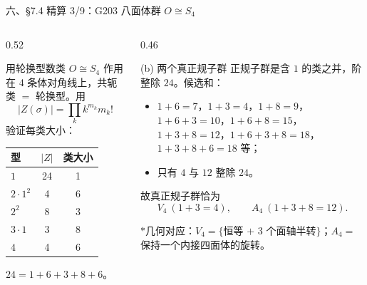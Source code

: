 \documentclass[aspectratio=169,10pt,fontset=none]{ctexbeamer}
\newcommand{\starpt}{\textcolor{accent}{\bfseries$\ast$}}
\begin{document}
\begin{frame}[t]{六、\S7.4 精算 3/9：G203 八面体群 $O\cong S_4$}
  \begin{columns}[T,onlytextwidth]
    \begin{column}{0.52\textwidth}
      \begin{block}{\footnotesize 用轮换型数类}
        \scriptsize
        $O\cong S_4$ 作用在 4 条体对角线上，共轭类 $=$ 轮换型。用
        \[ |Z(\sigma)|=\prod_k k^{m_k}m_k! \]
        验证每类大小：
        \begin{center}
          \renewcommand{\arraystretch}{1.12}
          \begin{tabular}{@{}l c c@{}}
            \toprule
            型 & $|Z|$ & 类大小\\
            \midrule
            $1$ & 24 & 1\\
            $2\cdot1^2$ & 4 & 6\\
            $2^2$ & 8 & 3\\
            $3\cdot1$ & 3 & 8\\
            $4$ & 4 & 6\\
            \bottomrule
          \end{tabular}
        \end{center}
        $24=1+6+3+8+6$。
      \end{block}
    \end{column}
    \begin{column}{0.46\textwidth}
      \begin{block}{\footnotesize (b) 两个真正规子群}
        \scriptsize
        正规子群是含 $1$ 的类之并，阶整除 $24$。候选和：
        \begin{itemize}\setlength{\itemsep}{0pt}
          \item $1+6=7$，$1+3=4$，$1+8=9$，$1+6+3=10$，$1+6+8=15$，$1+3+8=12$，$1+6+3+8=18$，$1+3+8+6=18$ 等；
          \item 只有 $4$ 与 $12$ 整除 $24$。
        \end{itemize}
        故真正规子群恰为
        \[ V_4\ (1+3=4),\qquad A_4\ (1+3+8=12). \]
      \end{block}
      \footnotesize\color{ink!80}
      \starpt 几何对应：$V_4=\{$恒等 $+$ 3 个面轴半转$\}$；$A_4=$ 保持一个内接四面体的旋转。
    \end{column}
  \end{columns}
\end{frame}
\end{document}
